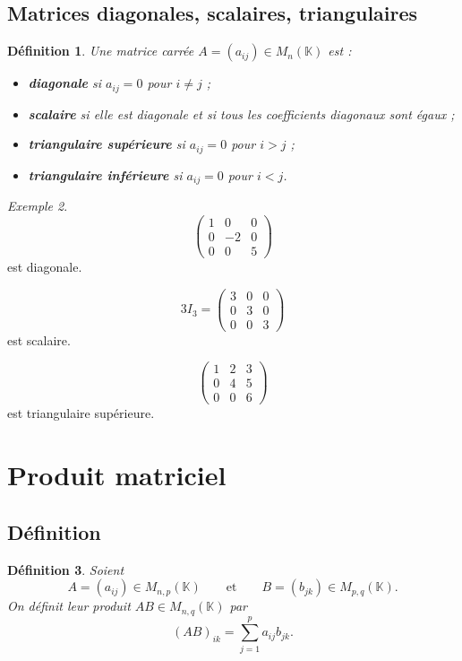 \documentclass[11pt,a4paper]{article}
\newtheorem{definition}{Définition}[section]
\theoremstyle{remark}
\newtheorem{exemple}[definition]{Exemple}
\newcommand{\K}{\mathbb{K}}
\begin{document}
\subsection{Matrices diagonales, scalaires, triangulaires}

\begin{definition}
Une matrice carrée \(A=(a_{ij})\in M_n(\K)\) est :
\begin{itemize}
    \item \textbf{diagonale} si \(a_{ij}=0\) pour \(i\neq j\) ;
    \item \textbf{scalaire} si elle est diagonale et si tous les coefficients diagonaux sont égaux ;
    \item \textbf{triangulaire supérieure} si \(a_{ij}=0\) pour \(i>j\) ;
    \item \textbf{triangulaire inférieure} si \(a_{ij}=0\) pour \(i<j\).
\end{itemize}
\end{definition}

\begin{exemple}
\[
\begin{pmatrix}
1 & 0 & 0\\
0 & -2 & 0\\
0 & 0 & 5
\end{pmatrix}
\]
est diagonale.

\[
3I_3=
\begin{pmatrix}
3 & 0 & 0\\
0 & 3 & 0\\
0 & 0 & 3
\end{pmatrix}
\]
est scalaire.

\[
\begin{pmatrix}
1 & 2 & 3\\
0 & 4 & 5\\
0 & 0 & 6
\end{pmatrix}
\]
est triangulaire supérieure.
\end{exemple}

\section{Produit matriciel}

\subsection{Définition}

\begin{definition}
Soient
\[
A=(a_{ij})\in M_{n,p}(\K)
\qquad \text{et} \qquad
B=(b_{jk})\in M_{p,q}(\K).
\]
On définit leur produit \(AB\in M_{n,q}(\K)\) par
\[
(AB)_{ik}=\sum_{j=1}^p a_{ij}b_{jk}.
\]
\end{definition}
\end{document}
